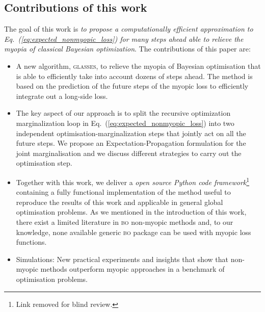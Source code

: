 \documentclass[twoside]{article}
\newcommand{\acr}[1]{\textsc{#1}\xspace}
\newcommand{\us}{\acr{glasses}}
\newcommand{\bo}{\acr{bo}}
\begin{document}
\subsection{Contributions of this work}

The goal of this work is \emph{to propose a computationally efficient approximation to Eq.~(\ref{eq:expected_nonmyopic_loss}) for many steps ahead able to relieve the myopia of classical Bayesian optimization}. The contributions of this paper are:
\begin{itemize}
\item A new algorithm, \us, to relieve the myopia of Bayesian optimisation that is able to efficiently take into account dozens of steps ahead. The method is based on the prediction of the future steps of the myopic loss to efficiently integrate out a long-side loss. 
\item The key aspect of our approach is to split the recursive optimization marginalization loop in Eq.~(\ref{eq:expected_nonmyopic_loss}) into two independent optimisation-marginalization steps that jointly act on all the future steps. We propose an Expectation-Propagation formulation for the joint marginalisation and we discuss different strategies to carry out the optimisation step.
\item Together with this work, we deliver a \emph{open source Python code framework}\footnote{Link removed for blind review.} containing a fully functional  implementation of the method useful to reproduce the results of this work and applicable in general global optimisation problems. As we mentioned in the introduction of this work, there exist a limited literature in \bo non-myopic methods and, to our knowledge, none available generic \bo package can be used with myopic loss functions. 
\item Simulations: New practical experiments and insights that show that non-myopic methods outperform myopic approaches in a benchmark of optimisation problems. 
\end{itemize}
\end{document}
